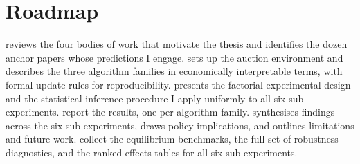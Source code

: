 \section{Roadmap}
\label{sec:intro_roadmap}

 reviews the four bodies of work that motivate the thesis and identifies the dozen anchor papers whose predictions I engage.  sets up the auction environment and describes the three algorithm families in economically interpretable terms, with formal update rules for reproducibility.  presents the factorial experimental design and the statistical inference procedure I apply uniformly to all six sub-experiments.  report the results, one per algorithm family.  synthesises findings across the six sub-experiments, draws policy implications, and outlines limitations and future work.  collect the equilibrium benchmarks, the full set of robustness diagnostics, and the ranked-effects tables for all six sub-experiments.
